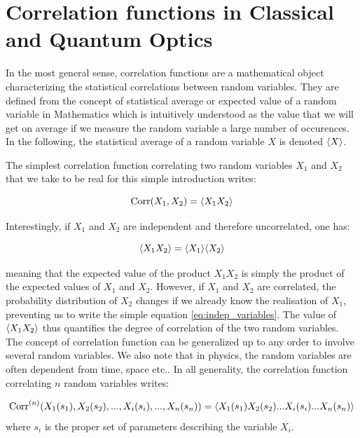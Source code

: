 \section{Correlation functions in Classical and Quantum Optics}

In the most general sense, correlation functions are a mathematical object characterizing the statistical correlations between random variables. They are defined from the concept of statistical average or expected value of a random variable in Mathematics which is intuitively understood as the value that we will get on average if we measure the random variable a large number of occurences. In the following, the statistical average of a random variable $X$ is denoted $\langle X\rangle$.

The simplest correlation function correlating two random variables $X_1$ and $X_2$ that we take to be real for this simple introduction writes:

\begin{equation}
    \text{Corr}(X_1,X_2)=\langle X_1 X_2\rangle
\end{equation}

\noindent Interestingly, if $X_1$ and $X_2$ are independent and therefore uncorrelated, one has:

\begin{equation}
    \langle X_1 X_2\rangle = \langle X_1\rangle \langle X_2\rangle
    \label{eq:indep_variables}
\end{equation}

\noindent meaning that the expected value of the product $X_1 X_2$ is simply the product of the expected values of $X_1$ and $X_2$. However, if $X_1$ and $X_2$ are correlated, the probability distribution of $X_2$ changes if we already know the realisation of $X_1$, preventing us to write the simple equation \ref{eq:indep_variables}. The value of $\langle X_1 X_2\rangle$ thus quantifies the degree of correlation of the two random variables. The concept of correlation function can be generalized up to any order to involve several random variables. We also note that in physics, the random variables are often dependent from time, space etc.. In all generality, the correlation function correlating $n$ random variables writes:

\begin{equation}
    \text{Corr}^{(n)}(X_1(s_1),X_2(s_2),...,X_i(s_i),...,X_n(s_n)) = \langle X_1(s_1) X_2(s_2) ... X_i(s_i) ... X_n(s_n)\rangle 
\end{equation}
\noindent where $s_i$ is the proper set of parameters describing the variable $X_i$.

